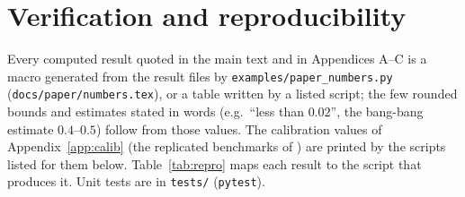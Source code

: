 \section{Verification and reproducibility}\label{app:repro}
Every computed result quoted in the main text and in Appendices A--C is a macro generated
from the result files by \texttt{examples/paper\_numbers.py} (\texttt{docs/paper/numbers.tex}),
or a table written by a listed script; the few rounded bounds and estimates stated in words
(e.g.\ ``less than $0.02$'', the bang-bang estimate $0.4$--$0.5$) follow from those values. The calibration values of Appendix~\ref{app:calib} (the replicated
benchmarks of \cite{pozzi2025}) are printed by the scripts listed for them below. Table~\ref{tab:repro}
maps each result to the script that produces it. Unit tests are in \texttt{tests/}
(\texttt{pytest}).

